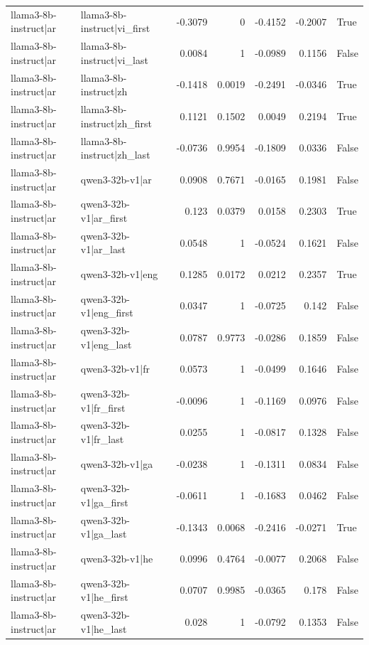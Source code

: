 \begin{table}
\begin{tabular}{l l r r r r l}
llama3-8b-instruct|ar & llama3-8b-instruct|vi_first & -0.3079 & 0 & -0.4152 & -0.2007 & True \\
llama3-8b-instruct|ar & llama3-8b-instruct|vi_last & 0.0084 & 1 & -0.0989 & 0.1156 & False \\
llama3-8b-instruct|ar & llama3-8b-instruct|zh & -0.1418 & 0.0019 & -0.2491 & -0.0346 & True \\
llama3-8b-instruct|ar & llama3-8b-instruct|zh_first & 0.1121 & 0.1502 & 0.0049 & 0.2194 & True \\
llama3-8b-instruct|ar & llama3-8b-instruct|zh_last & -0.0736 & 0.9954 & -0.1809 & 0.0336 & False \\
llama3-8b-instruct|ar & qwen3-32b-v1|ar & 0.0908 & 0.7671 & -0.0165 & 0.1981 & False \\
llama3-8b-instruct|ar & qwen3-32b-v1|ar_first & 0.123 & 0.0379 & 0.0158 & 0.2303 & True \\
llama3-8b-instruct|ar & qwen3-32b-v1|ar_last & 0.0548 & 1 & -0.0524 & 0.1621 & False \\
llama3-8b-instruct|ar & qwen3-32b-v1|eng & 0.1285 & 0.0172 & 0.0212 & 0.2357 & True \\
llama3-8b-instruct|ar & qwen3-32b-v1|eng_first & 0.0347 & 1 & -0.0725 & 0.142 & False \\
llama3-8b-instruct|ar & qwen3-32b-v1|eng_last & 0.0787 & 0.9773 & -0.0286 & 0.1859 & False \\
llama3-8b-instruct|ar & qwen3-32b-v1|fr & 0.0573 & 1 & -0.0499 & 0.1646 & False \\
llama3-8b-instruct|ar & qwen3-32b-v1|fr_first & -0.0096 & 1 & -0.1169 & 0.0976 & False \\
llama3-8b-instruct|ar & qwen3-32b-v1|fr_last & 0.0255 & 1 & -0.0817 & 0.1328 & False \\
llama3-8b-instruct|ar & qwen3-32b-v1|ga & -0.0238 & 1 & -0.1311 & 0.0834 & False \\
llama3-8b-instruct|ar & qwen3-32b-v1|ga_first & -0.0611 & 1 & -0.1683 & 0.0462 & False \\
llama3-8b-instruct|ar & qwen3-32b-v1|ga_last & -0.1343 & 0.0068 & -0.2416 & -0.0271 & True \\
llama3-8b-instruct|ar & qwen3-32b-v1|he & 0.0996 & 0.4764 & -0.0077 & 0.2068 & False \\
llama3-8b-instruct|ar & qwen3-32b-v1|he_first & 0.0707 & 0.9985 & -0.0365 & 0.178 & False \\
llama3-8b-instruct|ar & qwen3-32b-v1|he_last & 0.028 & 1 & -0.0792 & 0.1353 & False \\

\end{tabular}
\end{table}
